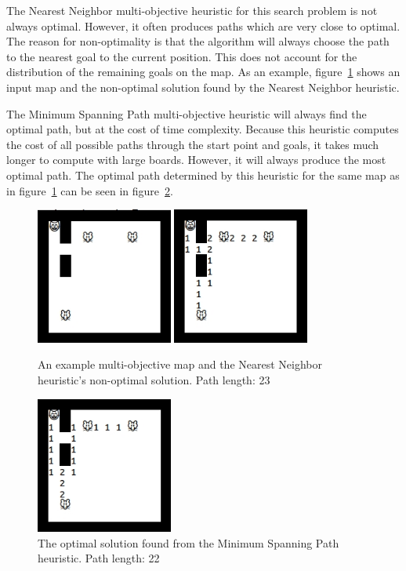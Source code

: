 \documentclass[12pt, conference, compsocconf]{IEEEtran}
\begin{document}
The Nearest Neighbor multi-objective heuristic for this search problem is not
always optimal.  However, it often produces paths which are very close to
optimal.  The reason for non-optimality is that the algorithm will always
choose the path to the nearest goal to the current position.  This does not
account for the distribution of the remaining goals on the map.  As an example,
figure~\ref{nonopt} shows an input map and the non-optimal solution found by
the Nearest Neighbor heuristic.

The Minimum Spanning Path multi-objective heuristic will always find the
optimal path, but at the cost of time complexity.  Because this heuristic
computes the cost of all possible paths through the start point and goals, it
takes much longer to compute with large boards.  However, it will always
produce the most optimal path.  The optimal path determined by this heuristic
for the same map as in figure~\ref{nonopt} can be seen in figure~\ref{opt}.

\begin{figure}[t]
    \centering
    \includegraphics[width=0.4\textwidth]{map_mo.jpg}
    \includegraphics[width=0.4\textwidth]{map_mo_nonopt.jpg}
    \caption{An example multi-objective map and the Nearest Neighbor
heuristic's non-optimal solution.  Path length: 23}
    \label{nonopt}
\end{figure}
\begin{figure}[t]
    \centering
    \includegraphics[width=0.4\textwidth]{map_mo_opt.jpg}
    \caption{The optimal solution found from the Minimum Spanning Path
heuristic.  Path length: 22}
    \label{opt}
\end{figure}
\end{document}
